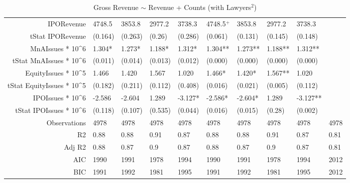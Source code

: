 \begin{table}[ht]
\begin{tabular}{rlllllllll}
  IPORevenue & 4748.5 & 3853.8 & 2977.2 & 3738.3 & 4748.5$^{+}$ & 3853.8 & 2977.2 & 3738.3 &  \\ 
  tStat IPORevenue & (0.164) & (0.263) & (0.26) & (0.286) & (0.061) & (0.131) & (0.145) & (0.148) &  \\ 
  MnAIssues * 10^6 & 1.304* & 1.273* & 1.188* & 1.312* & 1.304** & 1.273** & 1.188** & 1.312** &  \\ 
  tStat MnAIssues * 10^6 & (0.011) & (0.014) & (0.013) & (0.012) & (0.000) & (0.000) & (0.000) & (0.000) &  \\ 
  EquityIssues * 10^5 & 1.466 & 1.420 & 1.567 & 1.020 & 1.466* & 1.420* & 1.567** & 1.020 &  \\ 
  tStat EquityIssues * 10^5 & (0.182) & (0.211) & (0.112) & (0.408) & (0.016) & (0.021) & (0.005) & (0.112) &  \\ 
  IPOIssues * 10^6 & -2.586 & -2.604 & 1.289 & -3.127* & -2.586* & -2.604* & 1.289 & -3.127** &  \\ 
  tStat IPOIssues * 10^6 & (0.118) & (0.107) & (0.535) & (0.044) & (0.016) & (0.015) & (0.28) & (0.002) &  \\ 
  Observations & 4978 & 4978 & 4978 & 4978 & 4978 & 4978 & 4978 & 4978 & 4978 \\ 
  R2 & 0.88 & 0.88 & 0.91 & 0.87 & 0.88 & 0.88 & 0.91 & 0.87 & 0.81 \\ 
  Adj R2 & 0.88 & 0.87 & 0.9 & 0.87 & 0.88 & 0.87 & 0.9 & 0.87 & 0.81 \\ 
  AIC & 1990 & 1991 & 1978 & 1994 & 1990 & 1991 & 1978 & 1994 & 2012 \\ 
  BIC & 1991 & 1992 & 1981 & 1995 & 1991 & 1992 & 1981 & 1995 & 2012 \\ 
   \hline
\end{tabular}
\caption{Gross Revenue $\sim$ Revenue + Counts (with Lawyers$^2$)} 
\end{table}
